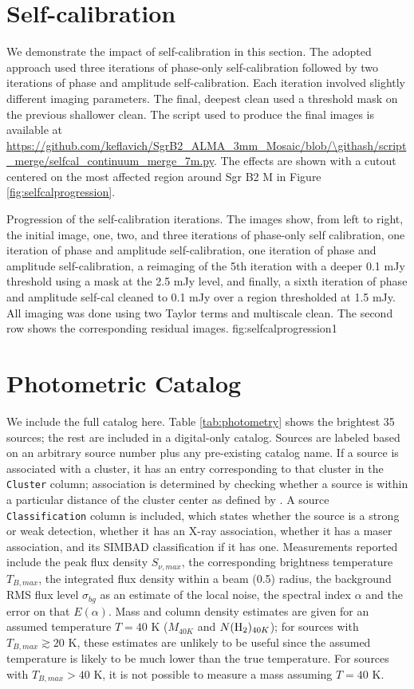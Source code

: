 \documentclass[twocolumn]{aastex61}
\begin{document}
\section{Self-calibration}
\label{sec:selfcal}
We demonstrate the impact of self-calibration in this section.  The adopted approach
used three iterations of phase-only self-calibration followed by two iterations of
phase and amplitude self-calibration.  Each iteration involved slightly
different imaging parameters.  The final, deepest clean used a threshold mask
on the previous shallower clean. The script used to produce the final images is
available at
\url{https://github.com/keflavich/SgrB2_ALMA_3mm_Mosaic/blob/\githash/script_merge/selfcal_continuum_merge_7m.py}.
The effects are shown with a cutout centered on the most affected region around
Sgr B2 M in Figure \ref{fig:selfcalprogression}.

{Progression of the self-calibration iterations.  The images show, from left to
right, the initial image, one, two, and three iterations of phase-only self
calibration, one iteration of phase and amplitude self-calibration, one
iteration of phase and amplitude self-calibration, a reimaging of the 5th
iteration with a deeper 0.1 mJy threshold using a mask at the 2.5 mJy level,
and finally, a sixth iteration of phase and amplitude self-cal cleaned to
0.1 mJy over a region thresholded at 1.5 mJy.
All imaging was done using two Taylor terms and multiscale clean.
The second row shows the corresponding residual images.}
{fig:selfcalprogression}{1}{\textwidth}

\section{Photometric Catalog}
We include the full catalog here.  Table \ref{tab:photometry} shows
the brightest 35 sources; the rest are included in a digital-only catalog.
Sources are labeled based on an arbitrary source
number plus any pre-existing catalog name.  If a source is associated with a cluster,
it has an entry corresponding to that cluster in the \texttt{Cluster} column;
association is determined by checking whether a source is within a particular distance
of the cluster center as defined by \citet{Schmiedeke2016a}.  A source
\texttt{Classification} column is included, which states whether the source
is a strong or weak detection, whether it has an X-ray association, whether it
has a maser association, and its SIMBAD classification if it has one.
Measurements reported include the peak flux density $S_{\nu,max}$, the
corresponding brightness temperature $T_{B,max}$, the integrated flux density
within a beam (0.5\arcsec) radius, the background RMS flux level $\sigma_{bg}$
as an estimate of the local noise, the spectral index $\alpha$ and the error on
that $E(\alpha)$.  Mass and column density estimates are given for an assumed
temperature $T=40$ K ($M_{40K}$ and $N(\textrm{H}_{2})_{40K}$); for sources with
$T_{B,max}\gtrsim20$ K, these estimates are unlikely to be useful since the
assumed temperature is likely to be much lower than the true temperature.
For sources with $T_{B,max}>40$ K, it is not possible to measure a mass
assuming $T=40$ K.


\end{document}
